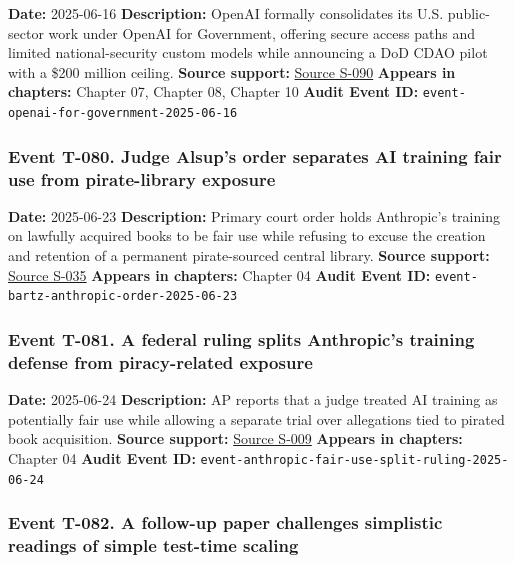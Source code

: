 \documentclass[
  american,
  11pt,
  letterpaper,
]{article}
\begin{document}
\textbf{Date:} 2025-06-16 \textbf{Description:} OpenAI formally
consolidates its U.S. public-sector work under OpenAI for Government,
offering secure access paths and limited national-security custom models
while announcing a DoD CDAO pilot with a \$200 million ceiling.
\textbf{Source support:}
\hyperref[source-s-090-introducing-openai-for-government]{Source S-090}
\textbf{Appears in chapters:} Chapter 07, Chapter 08, Chapter 10
\textbf{Audit Event ID:} \texttt{event-openai-for-government-2025-06-16}

\subsubsection{Event T-080. Judge Alsup's order separates AI training
fair use from pirate-library
exposure}\label{event-t-080-judge-alsup-s-order-separates-ai-training-fair-use-from-pirate-library-exposure}

\textbf{Date:} 2025-06-23 \textbf{Description:} Primary court order
holds Anthropic's training on lawfully acquired books to be fair use
while refusing to excuse the creation and retention of a permanent
pirate-sourced central library. \textbf{Source support:}
\hyperref[source-s-035-bartz-et-al-v-anthropic-pbc-order-on-fair-use]{Source
S-035} \textbf{Appears in chapters:} Chapter 04 \textbf{Audit Event ID:}
\texttt{event-bartz-anthropic-order-2025-06-23}

\subsubsection{Event T-081. A federal ruling splits Anthropic's training
defense from piracy-related
exposure}\label{event-t-081-a-federal-ruling-splits-anthropic-s-training-defense-from-piracy-related-exposure}

\textbf{Date:} 2025-06-24 \textbf{Description:} AP reports that a judge
treated AI training as potentially fair use while allowing a separate
trial over allegations tied to pirated book acquisition. \textbf{Source
support:}
\hyperref[source-s-009-anthropic-wins-ruling-on-ai-training-in-copyright-lawsuit-but-must-face-trial-on-pirated-books]{Source
S-009} \textbf{Appears in chapters:} Chapter 04 \textbf{Audit Event ID:}
\texttt{event-anthropic-fair-use-split-ruling-2025-06-24}

\subsubsection{Event T-082. A follow-up paper challenges simplistic
readings of simple test-time
scaling}\label{event-t-082-a-follow-up-paper-challenges-simplistic-readings-of-simple-test-time-scaling}
\end{document}
